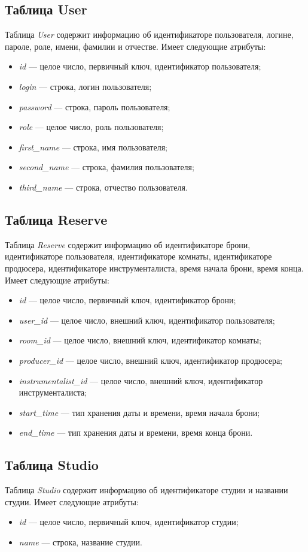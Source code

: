 \subsection{Таблица User}
Таблица \textit{User} содержит информацию об идентификаторе пользователя, логине, пароле, роле, имени, фамилии и отчестве.
Имеет следующие атрибуты:
\begin{itemize}
	\item \textit{id} --- целое число, первичный ключ, идентификатор пользователя;
	\item \textit{login} --- строка, логин пользователя;
	\item \textit{password} --- строка, пароль пользователя;
	\item \textit{role} --- целое число, роль пользователя;
	\item \textit{first\_name} --- строка, имя пользователя;
	\item \textit{second\_name} --- строка, фамилия пользователя;
	\item \textit{third\_name} --- строка, отчество пользователя.
\end{itemize}
\subsection{Таблица Reserve}
Таблица \textit{Reserve} содержит информацию об идентификаторе брони, идентификаторе пользователя, идентификаторе комнаты, идентификаторе продюсера, идентификаторе инструменталиста, время начала брони, время конца.
Имеет следующие атрибуты:
\begin{itemize}
	\item \textit{id} --- целое число, первичный ключ, идентификатор брони;
	\item \textit{user\_id} --- целое число, внешний ключ, идентификатор пользователя;
	\item \textit{room\_id} --- целое число, внешний ключ, идентификатор комнаты;
	\item \textit{producer\_id} --- целое число, внешний ключ, идентификатор продюсера;
	\item \textit{instrumentalist\_id} --- целое число, внешний ключ, идентификатор инструменталиста;
	\item \textit{start\_time} --- тип хранения даты и времени, время начала брони;
	\item \textit{end\_time} --- тип хранения даты и времени, время конца брони.
\end{itemize}
\subsection{Таблица Studio}
Таблица \textit{Studio} содержит информацию об идентификаторе студии и названии студии.
Имеет следующие атрибуты:
\begin{itemize}
	\item \textit{id} --- целое число, первичный ключ, идентификатор студии;
	\item \textit{name} --- строка, название студии.
\end{itemize}
